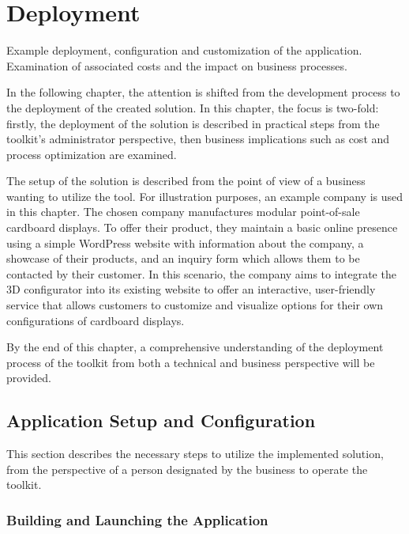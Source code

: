 \chapter{Deployment}

\begin{chapterabstract}
    Example deployment, configuration and customization of the application. Examination of associated costs and the impact on business processes.
\end{chapterabstract}

In the following chapter, the attention is shifted from the development process to the deployment of the created solution. In this chapter, the focus is two-fold: firstly, the deployment of the solution is described in practical steps from the toolkit's administrator perspective, then business implications such as cost and process optimization are examined.

The setup of the solution is described from the point of view of a business wanting to utilize the tool. For illustration purposes, an example company is used in this chapter. The chosen company manufactures modular point-of-sale cardboard displays. To offer their product, they maintain a basic online presence using a simple WordPress website with information about the company, a showcase of their products, and an inquiry form which allows them to be contacted by their customer. In this scenario, the company aims to integrate the 3D configurator into its existing website to offer an interactive, user-friendly service that allows customers to customize and visualize options for their own configurations of cardboard displays.

By the end of this chapter, a comprehensive understanding of the deployment process of the toolkit from both a technical and business perspective will be provided.


\section{Application Setup and Configuration}

This section describes the necessary steps to utilize the implemented solution, from the perspective of a person designated by the business to operate the toolkit.


\subsection{Building and Launching the Application}

